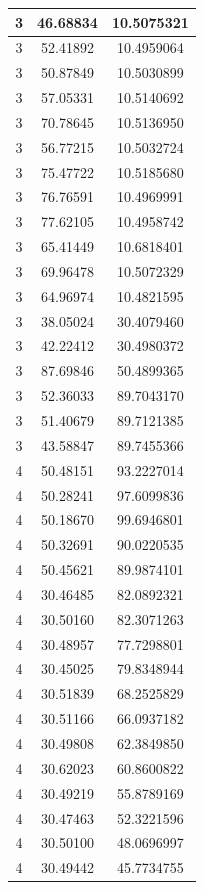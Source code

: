 \documentclass[
]{book}
\begin{document}
\begin{tabular}{c|c|c}
\hline
3 & 46.68834 & 10.5075321\\
\hline
3 & 52.41892 & 10.4959064\\
\hline
3 & 50.87849 & 10.5030899\\
\hline
3 & 57.05331 & 10.5140692\\
\hline
3 & 70.78645 & 10.5136950\\
\hline
3 & 56.77215 & 10.5032724\\
\hline
3 & 75.47722 & 10.5185680\\
\hline
3 & 76.76591 & 10.4969991\\
\hline
3 & 77.62105 & 10.4958742\\
\hline
3 & 65.41449 & 10.6818401\\
\hline
3 & 69.96478 & 10.5072329\\
\hline
3 & 64.96974 & 10.4821595\\
\hline
3 & 38.05024 & 30.4079460\\
\hline
3 & 42.22412 & 30.4980372\\
\hline
3 & 87.69846 & 50.4899365\\
\hline
3 & 52.36033 & 89.7043170\\
\hline
3 & 51.40679 & 89.7121385\\
\hline
3 & 43.58847 & 89.7455366\\
\hline
4 & 50.48151 & 93.2227014\\
\hline
4 & 50.28241 & 97.6099836\\
\hline
4 & 50.18670 & 99.6946801\\
\hline
4 & 50.32691 & 90.0220535\\
\hline
4 & 50.45621 & 89.9874101\\
\hline
4 & 30.46485 & 82.0892321\\
\hline
4 & 30.50160 & 82.3071263\\
\hline
4 & 30.48957 & 77.7298801\\
\hline
4 & 30.45025 & 79.8348944\\
\hline
4 & 30.51839 & 68.2525829\\
\hline
4 & 30.51166 & 66.0937182\\
\hline
4 & 30.49808 & 62.3849850\\
\hline
4 & 30.62023 & 60.8600822\\
\hline
4 & 30.49219 & 55.8789169\\
\hline
4 & 30.47463 & 52.3221596\\
\hline
4 & 30.50100 & 48.0696997\\
\hline
4 & 30.49442 & 45.7734755\\

\end{tabular}
\end{document}
